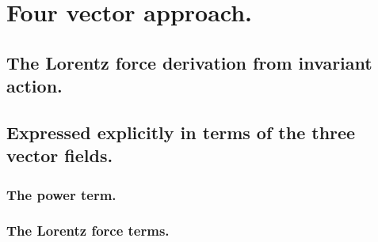 \section{Four vector approach.}
\subsection{The Lorentz force derivation from invariant action.}
\subsection{Expressed explicitly in terms of the three vector fields.}
\subsubsection{The power term.}
\subsubsection{The Lorentz force terms.}

\EndArticle
